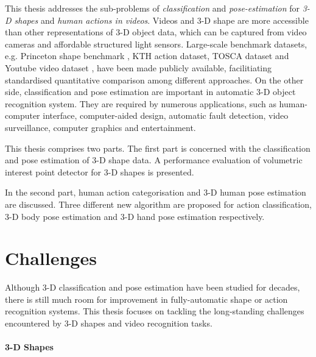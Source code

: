 \documentclass[10pt, a4paper]{article}
\begin{document}
This thesis addresses the sub-problems of \emph{classification} and \emph{pose-estimation} for \emph{3-D shapes} and \emph{human actions in videos}. 
Videos and 3-D shape are more accessible than other representations of 3-D object data, which can be captured from video cameras and affordable structured light sensors.    
Large-scale benchmark datasets, e.g. Princeton shape benchmark \cite{Shilane2004},  KTH action dataset\cite{Schuldt2004}, TOSCA dataset \cite{Bronstein2011} and Youtube video dataset \cite{Liu2009}, have been made publicly available, facilitiating standardised quantitative comparison among different approaches. 
On the other side, classification and pose estimation are important in automatic 3-D object recognition system. They are required by numerous applications, such as human-computer interface, computer-aided design, automatic fault detection, video surveillance, computer graphics and entertainment. 

This thesis comprises two parts. 
The first part is concerned with the classification and pose estimation of 3-D shape data.   
A performance evaluation of volumetric interest point detector for 3-D shapes is presented.  

In the second part, human action categorisation and 3-D human pose estimation are discussed. Three different new algorithm are proposed for action classification, 3-D body pose estimation and 3-D hand pose estimation respectively. 

\section{Challenges}


Although 3-D classification and pose estimation have been studied for decades, there is still much room for improvement in fully-automatic shape or action recognition systems. 
This thesis focuses on tackling the long-standing challenges encountered by 3-D shapes and video recognition tasks.  

\paragraph{3-D Shapes} 

\end{document}
